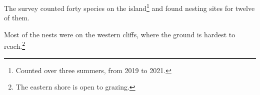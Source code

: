 \documentclass{article}
\begin{document}
The survey counted forty species on the island\footnote{Counted over three summers,
from 2019 to 2021.} and found nesting sites for twelve of them.

Most of the nests were on the western cliffs, where the ground is hardest to
reach.\footnote{The eastern shore is open to grazing.}
\end{document}
